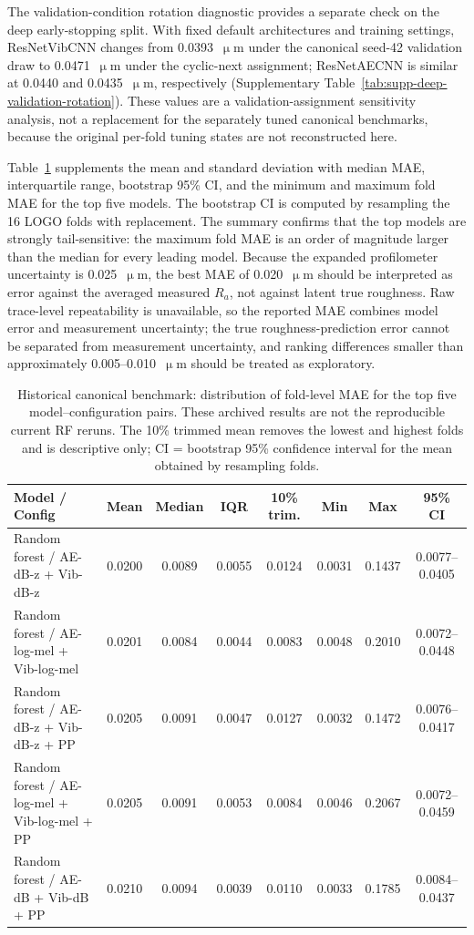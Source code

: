 The validation-condition rotation diagnostic provides a separate check on
the deep early-stopping split. With fixed default architectures and training
settings, ResNetVibCNN changes from 0.0393~\(\upmu\)m under the canonical
seed-42 validation draw to 0.0471~\(\upmu\)m under the cyclic-next
assignment; ResNetAECNN is similar at 0.0440 and 0.0435~\(\upmu\)m,
respectively (Supplementary Table~\ref{tab:supp-deep-validation-rotation}).
These values are a validation-assignment sensitivity analysis, not a
replacement for the separately tuned canonical benchmarks, because the
original per-fold tuning states are not reconstructed here.

Table~\ref{tbl:top10-summary} supplements the mean and standard
deviation with median MAE, interquartile range, bootstrap 95\% CI, and
the minimum and maximum fold MAE for the top five models. The bootstrap
CI is computed by resampling the 16 LOGO folds with replacement. The
summary confirms that the top models are strongly tail-sensitive:
the maximum fold MAE is an order of magnitude larger than the median for
every leading model. Because the expanded profilometer uncertainty is
0.025~\(\upmu\)m, the best MAE of 0.020~\(\upmu\)m should be interpreted as
error against the averaged measured \(R_a\), not against latent true
roughness. Raw trace-level repeatability is unavailable, so the reported
MAE combines model error and measurement uncertainty; the true
roughness-prediction error cannot be separated from measurement
uncertainty, and ranking differences smaller than approximately
0.005--0.010~\(\upmu\)m should be treated as exploratory.

\begin{table}[htbp]
\centering
\caption{Historical canonical benchmark: distribution of fold-level MAE for the top five
model--configuration pairs. These archived results are not the reproducible
current RF reruns. The 10\% trimmed mean removes the lowest and
highest folds and is descriptive only; CI = bootstrap 95\% confidence
interval for the mean obtained by resampling folds.}
\label{tbl:top10-summary}
\begin{tabular}{@{}lccccccc@{}}
\toprule
Model / Config & Mean & Median & IQR & 10\% trim. & Min & Max & 95\% CI \\
\midrule
Random forest / AE-dB-z + Vib-dB-z & 0.0200 & 0.0089 & 0.0055 & 0.0124 & 0.0031 & 0.1437 & 0.0077--0.0405 \\
Random forest / AE-log-mel + Vib-log-mel & 0.0201 & 0.0084 & 0.0044 & 0.0083 & 0.0048 & 0.2010 & 0.0072--0.0448 \\
Random forest / AE-dB-z + Vib-dB-z + PP & 0.0205 & 0.0091 & 0.0047 & 0.0127 & 0.0032 & 0.1472 & 0.0076--0.0417 \\
Random forest / AE-log-mel + Vib-log-mel + PP & 0.0205 & 0.0091 & 0.0053 & 0.0084 & 0.0046 & 0.2067 & 0.0072--0.0459 \\
Random forest / AE-dB + Vib-dB + PP & 0.0210 & 0.0094 & 0.0039 & 0.0110 & 0.0033 & 0.1785 & 0.0084--0.0437 \\
\bottomrule
\end{tabular}
\end{table}

